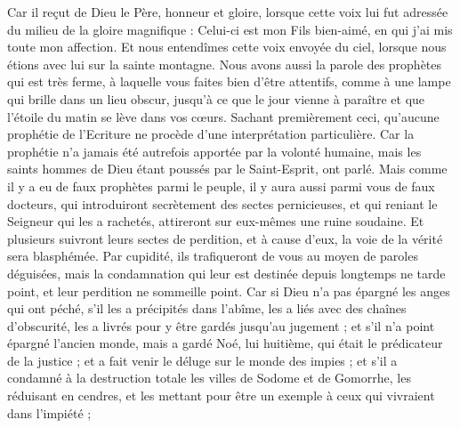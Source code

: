 \begin{multicols}{2}
Car il reçut de Dieu le Père, honneur et gloire, lorsque cette voix lui fut adressée du milieu de la gloire magnifique : Celui-ci est mon Fils bien-aimé, en qui j'ai mis toute mon affection.
Et nous entendîmes cette voix envoyée du ciel, lorsque nous étions avec lui sur la sainte montagne.
Nous avons aussi la parole des prophètes qui est très ferme, à laquelle vous faites bien d'être attentifs, comme à une lampe qui brille dans un lieu obscur, jusqu'à ce que le jour vienne à paraître et que l'étoile du matin se lève dans vos cœurs.
Sachant premièrement ceci, qu'aucune prophétie de l'Ecriture ne procède d’une interprétation particulière.
Car la prophétie n'a jamais été autrefois apportée par la volonté humaine, mais les saints hommes de Dieu étant poussés par le Saint-Esprit, ont parlé.
\VerseOne{}Mais comme il y a eu de faux prophètes parmi le peuple, il y aura aussi parmi vous de faux docteurs, qui introduiront secrètement des sectes pernicieuses, et qui reniant le Seigneur qui les a rachetés, attireront sur eux-mêmes une ruine soudaine.
Et plusieurs suivront leurs sectes de perdition, et à cause d'eux, la voie de la vérité sera blasphémée.
Par cupidité, ils trafiqueront de vous au moyen de paroles déguisées, mais la condamnation qui leur est destinée depuis longtemps ne tarde point, et leur perdition ne sommeille point.
Car si Dieu n'a pas épargné les anges qui ont péché, s’il les a précipités dans l'abîme, les a liés avec des chaînes d'obscurité, les a livrés pour y être gardés jusqu’au jugement ;
et s'il n'a point épargné l’ancien monde, mais a gardé Noé, lui huitième, qui était le prédicateur de la justice ; et a fait venir le déluge sur le monde des impies ;
et s'il a condamné à la destruction totale les villes de Sodome et de Gomorrhe, les réduisant en cendres, et les mettant pour être un exemple à ceux qui vivraient dans l'impiété ;

\end{multicols}
